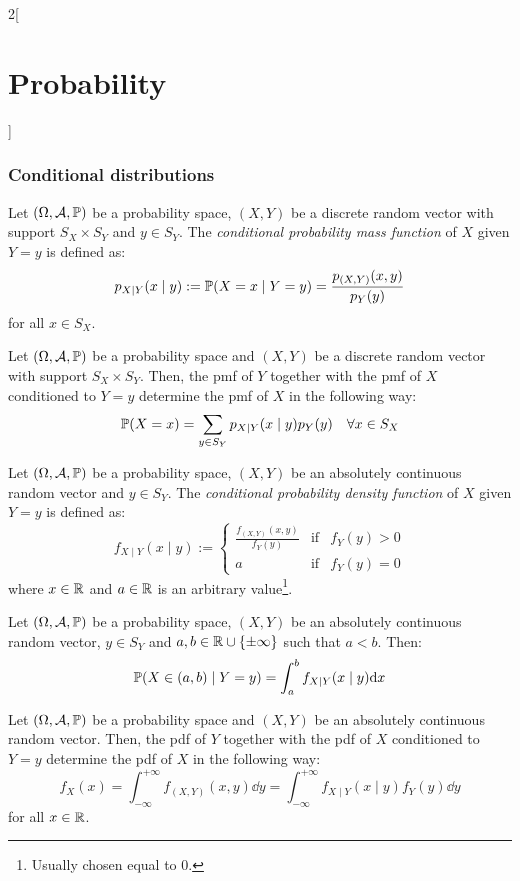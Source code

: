 \documentclass[../../../main.tex]{subfiles}
\begin{document}
\begin{multicols}{2}[\section{Probability}]
    \subsubsection{Conditional distributions}
    \begin{definition}
        Let $(\Omega,\mathcal{A},\mathbb{P})$ be a probability space, $(X,Y)$ be a discrete random vector with support $S_X\times S_Y$ and $y\in S_Y$. The \textit{conditional probability mass function} of $X$ given $Y=y$ is defined as: $$p_{X\mid Y}(x\mid y):=\mathbb{P}(X=x\mid Y=y)=\frac{p_{(X,Y)}(x,y)}{p_Y(y)}$$ for all $x\in S_X$.
    \end{definition}
    \begin{prop}
        Let $(\Omega,\mathcal{A},\mathbb{P})$ be a probability space and $(X,Y)$ be a discrete random vector with support $S_X\times S_Y$. Then, the pmf of $Y$ together with the pmf of $X$ conditioned to $Y=y$ determine the pmf of $X$ in the following way: $$\mathbb{P}(X=x)=\sum_{y\in S_Y}p_{X\mid Y}(x\mid y)p_Y(y)\quad\forall x\in S_X$$
    \end{prop}
    \begin{definition}
        Let $(\Omega,\mathcal{A},\mathbb{P})$ be a probability space, $(X,Y)$ be an absolutely continuous random vector and $y\in S_Y$. The \textit{conditional probability density function} of $X$ given $Y=y$ is defined as: $$f_{X\mid Y}(x\mid y):=\left\{
            \begin{array}{ccc}
                \frac{f_{(X,Y)}(x,y)}{f_Y(y)} & \text{if} & f_Y(y)>0 \\
                a                             & \text{if} & f_Y(y)=0
            \end{array}\right.
        $$ where $x\in\mathbb{R}$ and $a\in\mathbb{R}$ is an arbitrary value\footnote{Usually chosen equal to 0.}.
    \end{definition}
    \begin{prop}
        Let $(\Omega,\mathcal{A},\mathbb{P})$ be a probability space, $(X,Y)$ be an absolutely continuous random vector, $y\in S_Y$ and $a,b\in\mathbb{R}\cup\{\pm\infty\}$ such that $a<b$. Then: $$\mathbb{P}(X\in(a,b)\mid Y=y)=\int_a^bf_{X\mid Y}(x\mid y)\dd x$$
    \end{prop}
    \begin{prop}
        Let $(\Omega,\mathcal{A},\mathbb{P})$ be a probability space and $(X,Y)$ be an absolutely continuous random vector. Then, the pdf of $Y$ together with the pdf of $X$ conditioned to $Y=y$ determine the pdf of $X$ in the following way: $$f_X(x)=\int_{-\infty}^{+\infty}f_{(X,Y)}(x,y)\dd y=\int_{-\infty}^{+\infty}f_{X\mid Y}(x\mid y)f_Y(y)\dd y$$ for all $x\in\mathbb{R}$.
    \end{prop}

\end{multicols}
\end{document}
